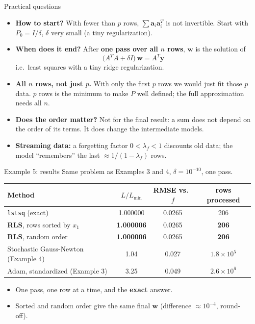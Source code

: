 \documentclass[10pt,aspectratio=169]{beamer}
\newcommand{\hl}[1]{\textcolor{accent}{\textbf{#1}}}
\begin{document}
\begin{frame}{Practical questions}
  \begin{itemize}
    \item \textbf{How to start?} With fewer than $p$ rows,
          $\sum \bm{a}_i\bm{a}_i^T$ is not invertible. Start with
          $P_0 = I/\delta$, $\delta$ very small (a tiny regularization).
    \item \textbf{When does it end?} After \hl{one pass over all $n$ rows},
          $\bm{w}$ is the solution of
          \[
            \big(A^TA + \delta I\big)\,\bm{w} = A^T\bm{y}
          \]
          i.e.\ least squares with a tiny ridge regularization.
    \item \textbf{All $n$ rows, not just $p$.} With only the first $p$ rows we
          would just fit those $p$ data. $p$ rows is the minimum to make $P$
          well defined; the full approximation needs all $n$.
    \item \textbf{Does the order matter?} Not for the final result: a sum does
          not depend on the order of its terms. It does change the
          intermediate models.
    \item \textbf{Streaming data:} a forgetting factor $0<\lambda_f<1$
          discounts old data; the model ``remembers'' the last
          $\approx 1/(1-\lambda_f)$ rows.
  \end{itemize}
\end{frame}

\begin{frame}{Example 5: results}
  Same problem as Examples 3 and 4, $\delta = 10^{-10}$, one pass.
  \vspace{0.5em}

  \centering
  \begin{tabular}{lccc}
    \toprule
    Method & $L/L_{\min}$ & RMSE vs.\ $f$ & rows processed \\
    \midrule
    \texttt{lstsq} (exact) & 1.000000 & 0.0265 & 206 \\
    \hl{RLS}, rows sorted by $x_1$ & \hl{1.000006} & 0.0265 & \hl{206} \\
    \hl{RLS}, random order & \hl{1.000006} & 0.0265 & \hl{206} \\
    \midrule
    Stochastic Gauss-Newton (Example 4) & 1.04 & 0.027 & $1.8\times10^{5}$ \\
    Adam, standardized (Example 3) & 3.25 & 0.049 & $2.6\times10^{6}$ \\
    \bottomrule
  \end{tabular}
  \vspace{0.8em}

  \raggedright
  \begin{itemize}
    \item One pass, one row at a time, and the \hl{exact} answer.
    \item Sorted and random order give the same final $\bm{w}$ (difference
          $\approx 10^{-4}$, round-off).
  \end{itemize}
\end{frame}
\end{document}
